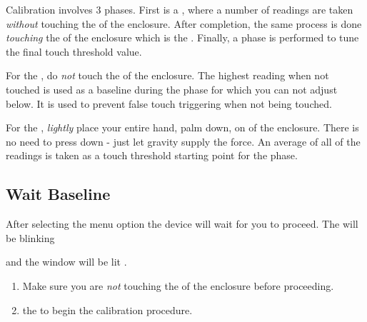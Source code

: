 Calibration involves \num{3} phases.  First is a , where a number of
readings are taken \textit{without} touching the  of the enclosure.
After completion, the same process is done \textit{touching} the  of the
enclosure which is the .  Finally, a  phase is performed to
tune the final touch threshold value.

\par\medskip

For the , do \textit{not} touch the  of the enclosure.  The
highest reading when not touched is used as a baseline during the 
phase for which you can not adjust below.  It is used to prevent false touch
triggering when not being touched.

\par\medskip

For the , \textit{lightly} place your entire hand, palm down, on
 of the enclosure.  There is no need to press down - just let gravity
supply the force.  An average of all of the readings is taken as a touch
threshold starting point for the  phase.

\subsection{Wait Baseline} 

After selecting the  menu option the device will wait for you to
proceed.  The  will be blinking

\begin{figure}[H]
\centering
\end{figure}

and the  window will be lit \cRe{}.

\begin{enumerate}
  \item Make sure you are \textit{not} touching the  of the enclosure
    before proceeding.
  \item {} the  to begin the calibration procedure.
\end{enumerate}


